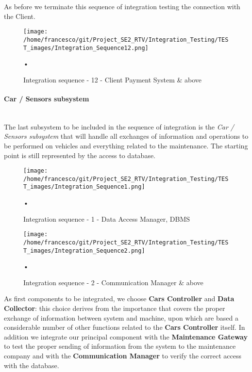 \documentclass[10pt, a4paper,titlepage]{article}
\begin{document}
As before we terminate this sequence of integration testing the connection with the Client.
\begin{figure}[h]
\begin{center}
\texttt{[image: /home/francesco/git/Project\_SE2\_RTV/Integration\_Testing/TEST\_images/Integration\_Sequence12.png]}
\caption{Integration sequence - 12 - Client Payment System \& above}
\label{fig:int_seq12}
\end{center}•
\end{figure}
\clearpage
\paragraph{Car / Sensors subsystem}\mbox{}\\
The last subsystem to be included in the sequence of integration is the \emph{Car / Sensors subsystem} that will handle all exchanges of information and operations to be performed on vehicles and everything related to the maintenance.
The starting point is still represented by the access to database.
\begin{figure}[h]
\begin{center}
\texttt{[image: /home/francesco/git/Project\_SE2\_RTV/Integration\_Testing/TEST\_images/Integration\_Sequence1.png]}
\caption{Integration sequence - 1 - Data Access Manager, DBMS}
\label{fig:int_seq1_3}
\end{center}•
\end{figure}
\begin{figure}[h]
\begin{center}
\texttt{[image: /home/francesco/git/Project\_SE2\_RTV/Integration\_Testing/TEST\_images/Integration\_Sequence2.png]}
\caption{Integration sequence - 2 - Communication Manager \& above}
\label{fig:int_seq2_3}
\end{center}•
\end{figure}
As first components to be integrated, we choose \textbf{Cars Controller} and \textbf{Data Collector}: this choice derives from the importance that covers the proper exchange of information between system and machine, upon which are based a considerable number of other functions related to the \textbf{Cars Controller} itself. In addition we integrate our principal component with the \textbf{Maintenance Gateway}  to test the proper sending of information from the system to the maintenance company and with the \textbf{Communication Manager} to verify the correct access with the database.
\end{document}
